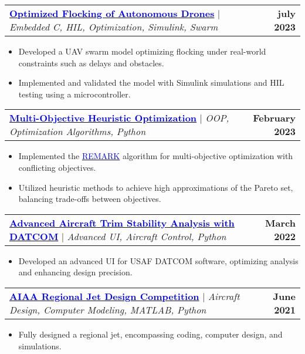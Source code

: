 \documentclass[letterpaper,11pt]{article}
\makeatletter
\newcommand{\resumeItem}[1]{
  \item\small{
    {#1 \vspace{-2pt}}
  }
}
\newcommand{\resumeProjectHeading}[2]{
    \item
    \begin{tabular*}{1.001\textwidth}{l@{\extracolsep{\fill}}r}
      \small#1 & \textbf{\small #2}\\
    \end{tabular*}\vspace{-7pt}
}
\newcommand{\resumeItemListStart}{\begin{itemize}}
\newcommand{\resumeItemListEnd}{\end{itemize}\vspace{-5pt}}
\makeatother
\begin{document}
    \resumeProjectHeading
    {
    	\textbf{\href{https://github.com/alibaniasad1999/Guidance-and-navigation}{\textcolor{blue}{Optimized Flocking of Autonomous Drones}}}
    	$|$ \emph{Embedded C, HIL, Optimization, Simulink, Swarm}}{july 2023}
    \resumeItemListStart
    \resumeItem{Developed a UAV swarm model optimizing flocking under real-world constraints such as delays and obstacles.}
    \resumeItem{Implemented and validated the model with Simulink simulations and HIL testing using a microcontroller.}
    \resumeItemListEnd

          \vspace{-18pt}
          \resumeProjectHeading
          {\textbf{\href{https://github.com/alibaniasad1999/Heuristic-optimization-algorithms}{\textcolor{blue}{Multi-Objective Heuristic Optimization}}} $|$ \emph{OOP, Optimization Algorithms, Python}}{February 2023}
          \resumeItemListStart
          \resumeItem{Implemented the 
          	\href{https://link.springer.com/article/10.1007/s12652-022-04332-8}{\textcolor{blue}{REMARK}}
          	algorithm for multi-objective optimization with conflicting objectives.}
          \resumeItem{Utilized heuristic methods to achieve high approximations of the Pareto set, balancing trade-offs between objectives.}
          \resumeItemListEnd
		
          
          \vspace{-18pt}
          
          
          \resumeProjectHeading
          {
          	\textbf{\href{https://github.com/alibaniasad1999/DATCOM-Trim-Diagram-GUI}{\textcolor{blue}{Advanced Aircraft Trim Stability Analysis with DATCOM}}}
          	$|$ \emph{Advanced UI, Aircraft Control, Python}}{March 2022}
          \resumeItemListStart
          \resumeItem{Developed an advanced UI for USAF DATCOM software, optimizing analysis and enhancing design precision.}
          
          \resumeItemListEnd
          
          
          
          \vspace{-18pt}
          \resumeProjectHeading
          {
          	\textbf{\href{https://github.com/alibaniasad1999/Airplane-Design-II}{\textcolor{blue}{AIAA Regional Jet Design Competition}}}
          	$|$ \emph{Aircraft Design, Computer Modeling, MATLAB, Python}}{June 2021}
          \resumeItemListStart
          \resumeItem{Fully designed a regional jet, encompassing coding, computer design, and simulations.}
          \resumeItemListEnd
          
\end{document}
